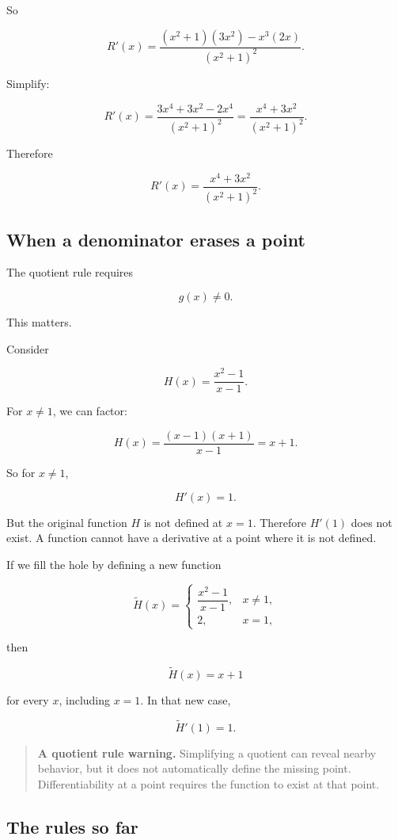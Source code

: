 So

\[
R'(x)
=
\frac{(x^2+1)(3x^2)-x^3(2x)}{(x^2+1)^2}.
\]

Simplify:

\[
R'(x)
=
\frac{3x^4+3x^2-2x^4}{(x^2+1)^2}
=
\frac{x^4+3x^2}{(x^2+1)^2}.
\]

Therefore

\[
\boxed{
R'(x)=\frac{x^4+3x^2}{(x^2+1)^2}.
}
\]

\subsection{When a denominator erases a point}
\label{subsec:denominator-erases-point}

The quotient rule requires

\[
g(x)\neq0.
\]

This matters.

Consider

\[
H(x)=\frac{x^2-1}{x-1}.
\]

For \(x\neq1\), we can factor:

\[
H(x)=\frac{(x-1)(x+1)}{x-1}=x+1.
\]

So for \(x\neq1\),

\[
H'(x)=1.
\]

But the original function \(H\) is not defined at \(x=1\).  Therefore \(H'(1)\) does not exist.  A function cannot have a derivative at a point where it is not defined.

If we fill the hole by defining a new function

\[
\widetilde H(x)=
\begin{cases}
\dfrac{x^2-1}{x-1}, & x\neq1,\\[8pt]
2, & x=1,
\end{cases}
\]

then

\[
\widetilde H(x)=x+1
\]

for every \(x\), including \(x=1\).  In that new case,

\[
\widetilde H'(1)=1.
\]

\begin{quote}
\textbf{A quotient rule warning.}
Simplifying a quotient can reveal nearby behavior, but it does not automatically define the missing point.  Differentiability at a point requires the function to exist at that point.
\end{quote}

\subsection{The rules so far}
\label{subsec:rules-so-far}

